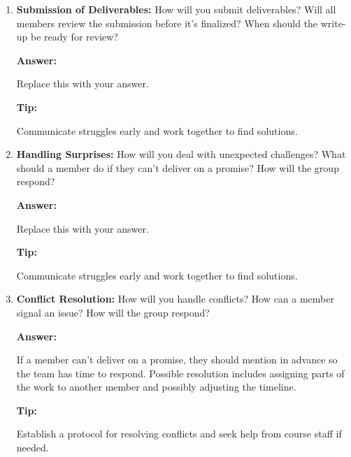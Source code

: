 \documentclass[12pt]{article}
\newenvironment{answer}[1][]{
  \color{blue}\textbf{Answer:}
}{}
\newenvironment{alice}[1][]{
  \color{black}\textbf{Tip:}
}{}
\begin{document}
\begin{enumerate}
\begin{alice}

Use a divide-and-conquer approach, ensuring an equal workload for all members.
\end{alice}

\item {\bf Submission of Deliverables:} How will you submit deliverables? Will all members review the submission before it’s finalized? When should the write-up be ready for review?

\begin{answer}

Replace this with your answer.
\end{answer}

\begin{alice}

Communicate struggles early and work together to find solutions.
\end{alice}

\item {\bf Handling Surprises:} How will you deal with unexpected challenges? What should a member do if they can’t deliver on a promise? How will the group respond?

\begin{answer}

Replace this with your answer.
\end{answer}

\begin{alice}

Communicate struggles early and work together to find solutions.
\end{alice}

\item {\bf Conflict Resolution:} How will you handle conflicts? How can a member signal an issue? How will the group respond?

\begin{answer}

If a member can't deliver on a promise, they should mention in advance so the team has time to respond. Possible resolution includes assigning parts of the work to another member and possibly adjusting the timeline. 

\end{answer}

\begin{alice}

Establish a protocol for resolving conflicts and seek help from course staff if needed.
\end{alice}

\end{enumerate}
\end{document}
